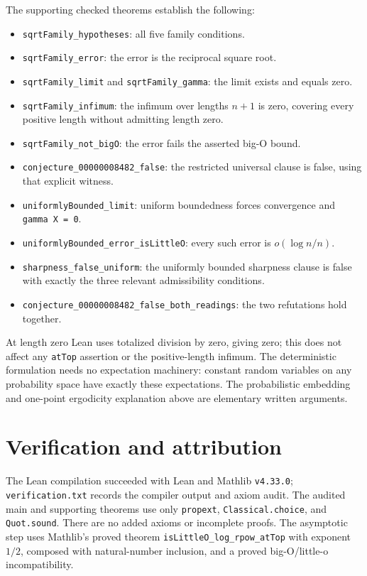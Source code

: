 \documentclass[11pt]{article}
\begin{document}
The supporting checked theorems establish the following:
\begin{itemize}
\item \texttt{sqrtFamily\_hypotheses}: all five family conditions.
\item \texttt{sqrtFamily\_error}: the error is the reciprocal square root.
\item \texttt{sqrtFamily\_limit} and \texttt{sqrtFamily\_gamma}: the limit exists
and equals zero.
\item \texttt{sqrtFamily\_infimum}: the infimum over lengths $n+1$ is zero,
covering every positive length without admitting length zero.
\item \texttt{sqrtFamily\_not\_bigO}: the error fails the asserted big-O bound.
\item \texttt{conjecture\_00000008482\_false}: the restricted universal clause
is false, using that explicit witness.
\item \texttt{uniformlyBounded\_limit}: uniform boundedness forces
convergence and \texttt{gamma X = 0}.
\item \texttt{uniformlyBounded\_error\_isLittleO}: every such error is
$o(\log n/n)$.
\item \texttt{sharpness\_false\_uniform}: the uniformly bounded sharpness
clause is false with exactly the three relevant admissibility conditions.
\item \texttt{conjecture\_00000008482\_false\_both\_readings}: the two
refutations hold together.
\end{itemize}
At length zero Lean uses totalized division by zero, giving zero; this
does not affect any \texttt{atTop} assertion or the positive-length infimum.
The deterministic formulation needs no expectation machinery: constant
random variables on any probability space have exactly these expectations.
The probabilistic embedding and one-point ergodicity explanation above
are elementary written arguments.

\section{Verification and attribution}
The Lean compilation succeeded with Lean and Mathlib \texttt{v4.33.0};
\texttt{verification.txt} records the compiler output and axiom audit. The audited main and supporting theorems use
only \texttt{propext}, \texttt{Classical.choice}, and \texttt{Quot.sound}.
There are no added axioms or incomplete proofs. The asymptotic step uses
Mathlib's proved theorem \texttt{isLittleO\_log\_rpow\_atTop} with
exponent $1/2$, composed with natural-number inclusion, and a proved
big-O/little-o incompatibility.
\end{document}
